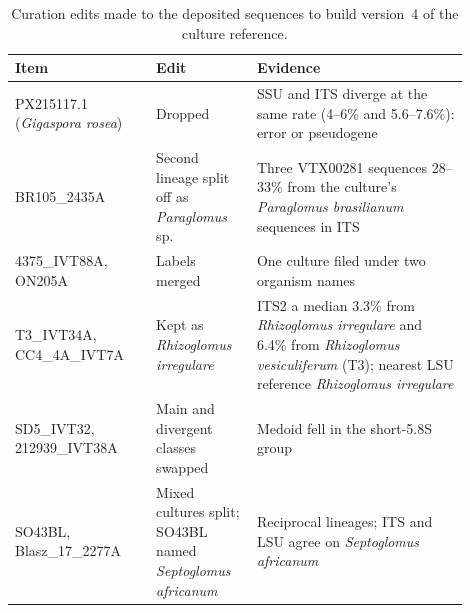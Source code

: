 \begin{table}[htbp]\centering
\begin{threeparttable}
\caption{Curation edits made to the deposited sequences to build version~4 of the culture reference.}
\label{tab:edits}
\small
\begin{tabular}{L{0.28\linewidth}L{0.20\linewidth}L{0.42\linewidth}}
\toprule
Item & Edit & Evidence\\
\midrule
PX215117.1 (\emph{Gigaspora rosea}) & Dropped & SSU and ITS diverge at the same rate (4--6\% and 5.6--7.6\%): error or pseudogene\\
BR105\_2435A & Second lineage split off as \emph{Paraglomus} sp. & Three VTX00281 sequences 28--33\% from the culture's \emph{Paraglomus brasilianum} sequences in ITS\\
4375\_IVT88A, ON205A & Labels merged & One culture filed under two organism names\\
T3\_IVT34A, CC4\_4A\_IVT7A & Kept as \emph{Rhizoglomus irregulare} & ITS2 a median 3.3\% from \emph{Rhizoglomus irregulare} and 6.4\% from \emph{Rhizoglomus vesiculiferum} (T3); nearest LSU reference \emph{Rhizoglomus irregulare}\\
SD5\_IVT32, 212939\_IVT38A & Main and divergent classes swapped & Medoid fell in the short-5.8S group\\
SO43BL, Blasz\_17\_2277A & Mixed cultures split; SO43BL named \emph{Septoglomus africanum} & Reciprocal lineages; ITS and LSU agree on \emph{Septoglomus africanum}\\
\bottomrule
\end{tabular}
\end{threeparttable}
\end{table}
